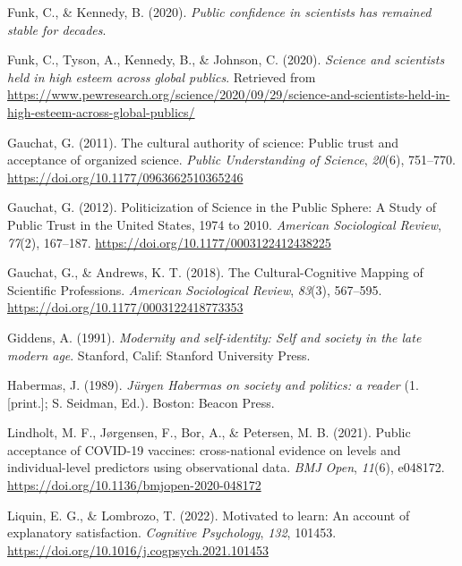 \documentclass[
  doc,floatsintext]{apa6}
\newlength{\cslhangindent}
\newenvironment{CSLReferences}[2] %
 {\begin{list}{}{%
  \setlength{\itemindent}{0pt}
  \setlength{\leftmargin}{0pt}
  \setlength{\parsep}{0pt}
  \ifodd #1
   \setlength{\leftmargin}{\cslhangindent}
   \setlength{\itemindent}{-1\cslhangindent}
  \fi
  \setlength{\itemsep}{#2\baselineskip}}}
 {\end{list}}
\begin{document}
\begin{CSLReferences}{1}{0}
Funk, C., \& Kennedy, B. (2020). \emph{Public confidence in scientists has remained stable for decades}.

Funk, C., Tyson, A., Kennedy, B., \& Johnson, C. (2020). \emph{Science and scientists held in high esteem across global publics}. Retrieved from \url{https://www.pewresearch.org/science/2020/09/29/science-and-scientists-held-in-high-esteem-across-global-publics/}

Gauchat, G. (2011). The cultural authority of science: Public trust and acceptance of organized science. \emph{Public Understanding of Science}, \emph{20}(6), 751--770. \url{https://doi.org/10.1177/0963662510365246}

Gauchat, G. (2012). Politicization of Science in the Public Sphere: A Study of Public Trust in the United States, 1974 to 2010. \emph{American Sociological Review}, \emph{77}(2), 167--187. \url{https://doi.org/10.1177/0003122412438225}

Gauchat, G., \& Andrews, K. T. (2018). The Cultural-Cognitive Mapping of Scientific Professions. \emph{American Sociological Review}, \emph{83}(3), 567--595. \url{https://doi.org/10.1177/0003122418773353}

Giddens, A. (1991). \emph{Modernity and self-identity: Self and society in the late modern age}. Stanford, Calif: Stanford University Press.

Habermas, J. (1989). \emph{Jürgen Habermas on society and politics: a reader} (1. {[}print.{]}; S. Seidman, Ed.). Boston: Beacon Press.

Lindholt, M. F., Jørgensen, F., Bor, A., \& Petersen, M. B. (2021). Public acceptance of COVID-19 vaccines: cross-national evidence on levels and individual-level predictors using observational data. \emph{BMJ Open}, \emph{11}(6), e048172. \url{https://doi.org/10.1136/bmjopen-2020-048172}

Liquin, E. G., \& Lombrozo, T. (2022). Motivated to learn: An account of explanatory satisfaction. \emph{Cognitive Psychology}, \emph{132}, 101453. \url{https://doi.org/10.1016/j.cogpsych.2021.101453}


\end{CSLReferences}
\end{document}
